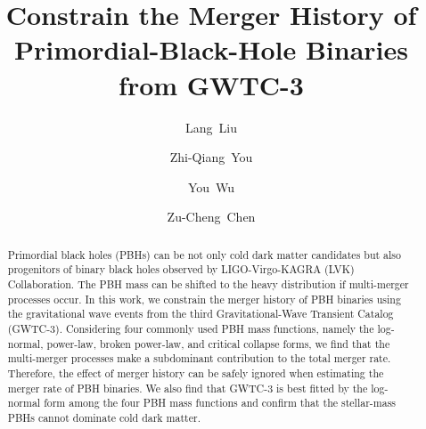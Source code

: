 \documentclass[
reprint,           %
superscriptaddress,%
amsmath,           %
amssymb,           %
aps,               %
prd,               %
notitlepage,       %
longbibliography,  %
floatfix,          %
nofootinbib,
]{revtex4-1}
\begin{document}
	
\title{Constrain the Merger History of Primordial-Black-Hole Binaries from GWTC-3}
	
\author{Lang~Liu}


\author{Zhi-Qiang~You}

\author{You~Wu}

\author{Zu-Cheng~Chen}

	
\begin{abstract}
Primordial black holes (PBHs) can be not only cold dark matter candidates but also progenitors of binary black holes observed by LIGO-Virgo-KAGRA (LVK) Collaboration.
The PBH mass can be shifted to the heavy distribution if multi-merger processes occur.
In this work, we constrain the merger history of PBH binaries using the gravitational wave events from the third Gravitational-Wave Transient Catalog (GWTC-3). Considering four commonly used PBH mass functions,   
namely the log-normal, power-law, broken power-law, and critical collapse forms, we find that the multi-merger processes make a subdominant contribution to the total merger rate. Therefore, the effect of merger history can be safely ignored when estimating the merger rate of PBH binaries. We also find that GWTC-3 is best fitted by the log-normal form among the four PBH mass functions and confirm that the stellar-mass PBHs cannot dominate cold dark matter.
\end{abstract}
	
\end{document}
